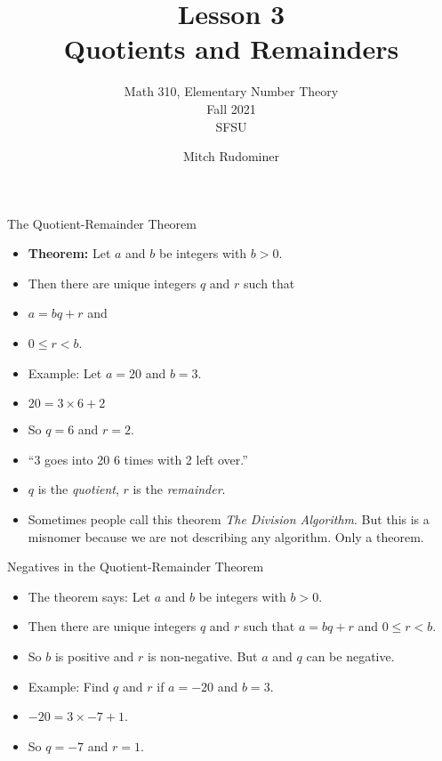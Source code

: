 \documentclass{beamer}
\title{Lesson 3 \\ Quotients and Remainders}
\subtitle{Math 310, Elementary Number Theory \\ Fall 2021 \\ SFSU}
\author{Mitch Rudominer}
\date{}
\begin{document}
\begin{frame}
  \titlepage
\end{frame}


\begin{frame}{The Quotient-Remainder Theorem}


\begin{itemize}
  \item \textbf{Theorem:} Let $a$ and $b$ be integers with $b>0$.
  \item Then there are unique integers $q$ and $r$ such that
  \item $a=bq+r$ and
  \item $0\leq r < b$.
  \item Example: Let $a=20$ and $b=3$.
  \item $20 = 3 \times 6 + 2$
  \item So $q=6$ and $r=2$.
  \item ``3 goes into 20 6 times with 2 left over.''
  \item $q$ is the \emph{quotient}, $r$ is the \emph{remainder}.
  \item Sometimes people call this theorem \emph{The Division Algorithm}.
  But this is a misnomer because we are not describing any algorithm. Only
  a theorem.
\end{itemize}

\end{frame}

\begin{frame}{Negatives in the Quotient-Remainder Theorem}


\begin{itemize}
  \item The theorem says: Let $a$ and $b$ be integers with $b>0$.
  \item Then there are unique integers $q$ and $r$ such that
  $a=bq+r$ and $0\leq r < b$.
  \item So $b$ is positive and $r$ is non-negative. But $a$ and $q$ can be negative.
  \item Example: Find $q$ and $r$ if $a=-20$ and $b=3$.
  \item $-20 = 3 \times -7 + 1$.
  \item So $q=-7$ and $r=1$.
\end{itemize}

\end{frame}
\end{document}
